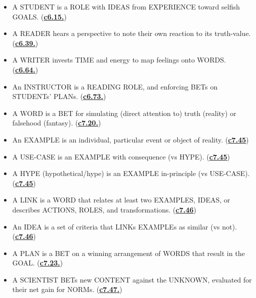 \documentclass[
]{book}
\begin{document}
\begin{itemize}
\item
  A STUDENT is a ROLE with IDEAS from EXPERIENCE toward selfish GOALS. (\protect\hyperlink{student}{\textbf{c6.15.}})\\
\item
  A READER hears a perspective to note their own reaction to its truth-value. (\protect\hyperlink{read}{\textbf{c6.39.}})\\
\item
  A WRITER invests TIME and energy to map feelings onto WORDS. (\protect\hyperlink{write-plan-1}{\textbf{c6.64.}})\\
\item
  An INSTRUCTOR is a READING ROLE, and enforcing BETs on STUDENTs' PLANs. (\protect\hyperlink{instructor}{\textbf{c6.73.}})\\
\item
  A WORD is a BET for simulating (direct attention to) truth (reality) or falsehood (fantasy). (\protect\hyperlink{word-as-bet}{\textbf{c7.20.}})\\
\item
  An EXAMPLE is an individual, particular event or object of reality. (\protect\hyperlink{example-and-idea}{\textbf{c7.45}})\\
\item
  A USE-CASE is an EXAMPLE with consequence (vs HYPE). (\protect\hyperlink{example-and-idea}{\textbf{c7.45}})\\
\item
  A HYPE (hypothetical/hype) is an EXAMPLE in-principle (vs USE-CASE).(\protect\hyperlink{example-and-idea}{\textbf{c7.45}})\\
\item
  A LINK is a WORD that relates at least two EXAMPLES, IDEAS, or describes ACTIONS, ROLES, and transformations. (\protect\hyperlink{example-and-idea}{\textbf{c7.46}})\\
\item
  An IDEA is a set of criteria that LINKs EXAMPLEs as similar (vs not). (\protect\hyperlink{example-and-idea}{\textbf{c7.46}})\\
\item
  A PLAN is a BET on a winning arrangement of WORDS that result in the GOAL. (\protect\hyperlink{word-as-bet}{\textbf{c7.23.}})\\
\item
  A SCIENTIST BETs new CONTENT against the UNKNOWN, evaluated for their net gain for NORMs. (\protect\hyperlink{role-scientist}{\textbf{c7.47.}})\\

\end{itemize}
\end{document}
